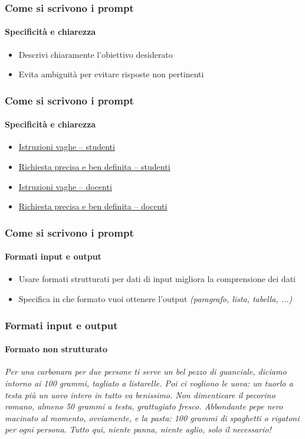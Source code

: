\begin{contentframe}
    \frametitle{Come si scrivono i prompt}
    \framesubtitle{Specificità e chiarezza}

    \begin{itemize}
        \item Descrivi chiaramente l'obiettivo desiderato

        \bigskip
        \item Evita ambiguità per evitare risposte non pertinenti
    \end{itemize}
\end{contentframe}

\begin{exampleframe}
    \frametitle{Come si scrivono i prompt}
    \framesubtitle{Specificità e chiarezza}

    \begin{itemize}
        \item \href{https://chatgpt.com/share/6759a98f-8218-8003-9eb8-bf85e9699044}{Istruzioni vaghe -- studenti}
        \item \href{https://chatgpt.com/share/6759aa0f-1404-8003-b15e-0330328e1803}{Richiesta precisa e ben definita -- studenti}

        \bigskip
        \item \href{https://chatgpt.com/share/6759aa68-0ba4-8003-ae44-d856b0014d10}{Istruzioni vaghe -- docenti}
        \item \href{https://chatgpt.com/share/6759ab31-c6c0-8003-a3aa-8c06ddf5ee13}{Richiesta precisa e ben definita -- docenti}
    \end{itemize}
\end{exampleframe}

\begin{contentframe}
    \frametitle{Come si scrivono i prompt}
    \framesubtitle{Formati input e output}

    \begin{itemize}
        \item Usare formati strutturati per dati di input migliora la comprensione dei dati

        \bigskip
        \item Specifica in che formato vuoi ottenere l'output \textit{(paragrafo, lista, tabella, ...)}
    \end{itemize}
\end{contentframe}

\begin{exampleframe}
    \frametitle{Formati input e output}
    \framesubtitle{Formato non strutturato}

    \justifying
    \textit{Per una carbonara per due persone ti serve un bel pezzo di guanciale, diciamo intorno ai 100 grammi, tagliato a listarelle. Poi ci vogliono le uova: un tuorlo a testa più un uovo intero in tutto va benissimo. Non dimenticare il pecorino romano, almeno 50 grammi a testa, grattugiato fresco. Abbondante pepe nero macinato al momento, ovviamente, e la pasta: 100 grammi di spaghetti o rigatoni per ogni persona. Tutto qui, niente panna, niente aglio, solo il necessario!}
\end{exampleframe}

